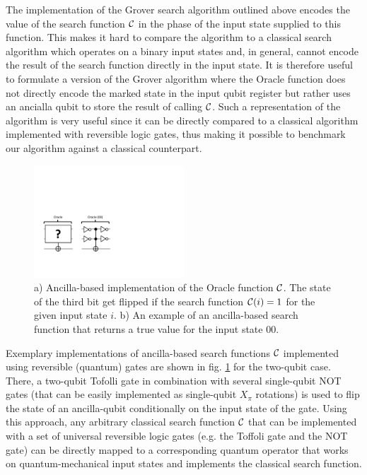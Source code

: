 The implementation of the Grover search algorithm outlined above encodes the value of the search function $\Or$ in the phase of the input state supplied to this function. This makes it hard to compare the algorithm to a classical search algorithm which operates on a binary input states and, in general, cannot encode the result of the search function directly in the input state. It is therefore useful to formulate a version of the Grover algorithm where the Oracle function does not directly encode the marked state in the input qubit register but rather uses an ancialla qubit to store the result of calling $\Or$. Such a representation of the algorithm is very useful since it can be directly compared to a classical algorithm implemented with reversible logic gates, thus making it possible to benchmark our algorithm against a classical counterpart. 

\begin{figure}
	\centering
		\includegraphics[width=0.5\textwidth]{./material/papers/grover/different_oracle_implementations}
	\caption[]{a) Ancilla-based implementation of the Oracle function $\Or$. The state of the third bit get flipped if the search function $\Or(i)=1$ for the given input state $i$. b) An example of an ancilla-based search function that returns a true value for the input state $00$.}
	\label{fig:GroverOracleImplementations}
\end{figure}

Exemplary implementations of ancilla-based search functions $\Or$ implemented using reversible (quantum) gates are shown in fig. \ref{fig:GroverOracleImplementations} for the two-qubit case. There, a two-qubit Tofolli gate in combination with several single-qubit NOT gates (that can be easily implemented as single-qubit $X_{\pi}$ rotations) is used to flip the state of an ancilla-qubit conditionally on the input state of the gate. Using this approach, any arbitrary classical search function $\Or$ that can be implemented with a set of universal reversible logic gates (e.g. the Toffoli gate and the NOT gate) can be directly mapped to a corresponding quantum operator that works on quantum-mechanical input states and implements the classical search function.

